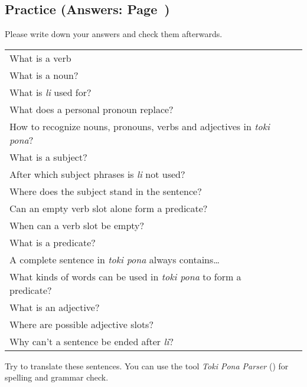 \subsection*{Practice (Answers: Page~\pageref{'basic_sentences'})}
%

Please write down your answers and check them afterwards. 

\begin{supertabular}{p{5cm}|ll}
What is a verb &&  \\ %
What is a noun? &&   \\ %
What is \textit{li} used for?  &&   \\ %
What does a personal pronoun replace? &&  \\ %
How to recognize nouns, pronouns, verbs and adjectives in \textit{toki pona}? &&  \\ %
What is a subject?  &&   \\ %
After which subject phrases is \textit{li} not used?  &&  \\ %
Where does the subject stand in the sentence?  &&    \\ %
Can an empty verb slot alone form a predicate? &&    \\ %
When can a verb slot be empty?  &&     \\ %
What is a predicate?  &&     \\ %
A complete sentence in \textit{toki pona} always contains\dots  &&     \\ %
What kinds of words can be used in \textit{toki pona} to form a predicate? &&   \\ %
What is an adjective?  &&    \\ %
Where are possible adjective slots?  &&    \\  %
Why can't a sentence be ended after \textit{li}? &&  \\ %
\end{supertabular} 

Try to translate these sentences. 
You can use the tool \textit{Toki Pona Parser} (\cite{www:rowa:02}) for spelling and grammar check. 

